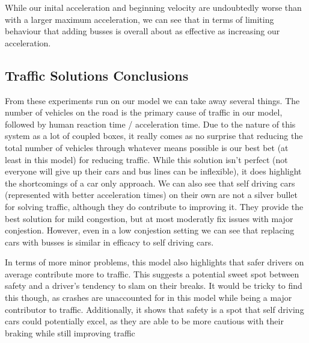 \documentclass[11pt]{article}
\begin{document}
\begin{multicols}{2}
			\indent While our inital acceleration and beginning velocity are undoubtedly worse than with a larger maximum acceleration, we can see that in terms of limiting behaviour that adding busses is overall about as effective
			as increasing our acceleration.

		\subsection*{Traffic Solutions Conclusions}

			\indent From these experiments run on our model we can take away several things. The number of vehicles on the road is the primary cause of traffic in our model, followed by human reaction time / acceleration
			time. Due to the nature of this system as a lot of coupled boxes, it really comes as no surprise that reducing the total number of vehicles through whatever means possible is our best bet (at least in this model)
			for reducing traffic. While this solution isn't perfect (not everyone will give up their cars and bus lines can be inflexible), it does highlight the shortcomings of a car only approach. We can also see that self driving cars (represented with better acceleration times) on their
			own are not a silver bullet for solving traffic, although they do contribute to improving it. They provide the best solution for mild congestion, but at most moderatly fix issues with major conjestion. However, even in a low conjestion setting we can see that replacing cars with busses is similar in efficacy to self driving cars.

			\indent In terms of more minor problems, this model also highlights that safer drivers on average contribute more to traffic. This suggests a potential sweet spot between safety and a driver's tendency to slam on their breaks. It would be tricky to find this though,
			as crashes are unaccounted for in this model while being a major contributor to traffic. Additionally, it shows that safety is a spot that self driving cars could potentially excel, as they are able to be more cautious with their braking while still improving traffic



	\end{multicols}
\end{document}
